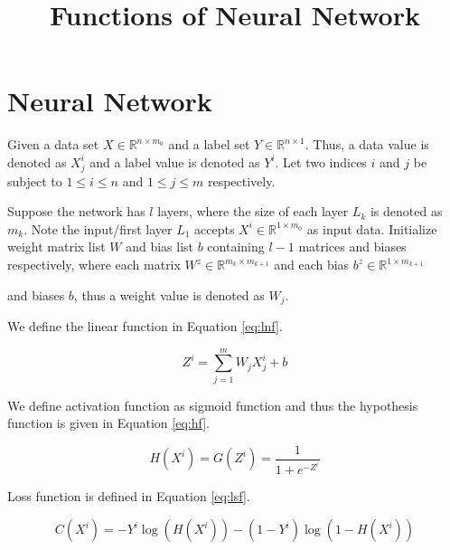 \documentclass[conference]{IEEEtran}
\begin{document}
\title{Functions of Neural Network}

\author{
}

\maketitle

\section{Neural Network}

Given a data set $X\in \mathbb{R}^{n\times m_{0}}$ and a label set $Y\in \mathbb{R}^{n\times 1}$. Thus, a data value is denoted as $X^{i}_{j}$ and a label value is denoted as $Y^{i}$. Let two indices $i$ and $j$ be subject to $1\leq i\leq n$ and $1\leq j \leq m$ respectively.

Suppose the network has $l$ layers, where the size of each layer $L_{k}$ is denoted as $m_{k}$. Note the input/first layer $L_{1}$ accepts $X^{i}\in \mathbb{R}^{1\times m_{0}}$ as input data. Initialize weight matrix list $W$ and bias list $b$ containing $l-1$ matrices and biases respectively, where each matrix $W^{z}\in \mathbb{R}^{m_{k}\times m_{k+1}}$ and each bias $b^{z}\in \mathbb{R}^{1\times m_{k+1}}$

 and biases $b$, thus a weight value is denoted as $W_{j}$.

We define the linear function in Equation \eqref{eq:lnf}.

\begin{equation}
\label{eq:lnf}
	Z^{i}=\sum_{j=1}^{m}W_{j}X^{i}_{j}+b
\end{equation}

We define activation function as sigmoid function and thus the hypothesis function is given in Equation \eqref{eq:hf}.

\begin{equation}
\label{eq:hf}
	H(X^{i}) = G(Z^{i})=\frac{1}{1+e^{-Z^{i}}}
\end{equation}

Loss function is defined in Equation \eqref{eq:lsf}.

\begin{equation}
\label{eq:lsf}
	C(X^{i})=-Y^{i}\log{(H(X^{i}))}-(1-Y^{i})\log{(1-H(X^{i}))}
\end{equation}
\end{document}
